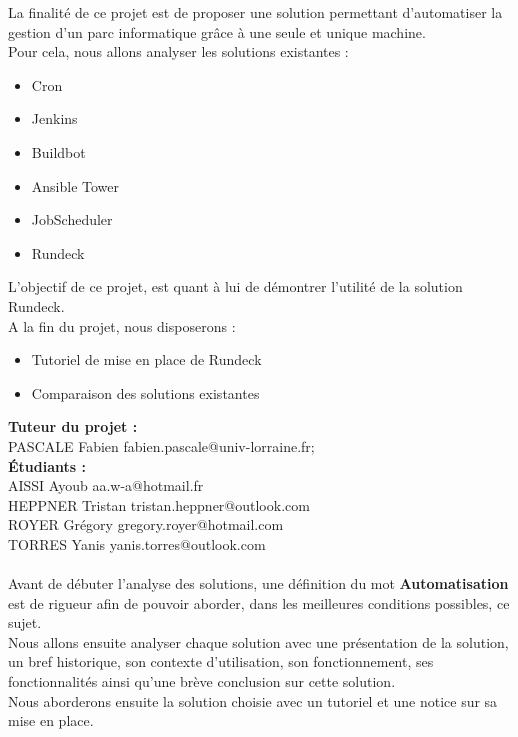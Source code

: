 \documentclass[12pt]{article}
\begin{document}
La finalité de ce projet est de proposer une solution permettant d'automatiser la gestion d'un parc informatique grâce à une seule et unique machine.
\vspace{0.5cm}
\\
Pour cela, nous allons analyser les solutions existantes :
\begin{itemize}
    \item Cron
    \item Jenkins
    \item Buildbot
    \item Ansible Tower
    \item JobScheduler
    \item Rundeck
\end{itemize}
\vspace{0.5cm}
L'objectif de ce projet, est quant à lui de démontrer l'utilité de la solution Rundeck.
\vspace{0.5cm}
\\
A la fin du projet, nous disposerons :
\begin{itemize}
    \item Tutoriel de mise en place de Rundeck
    \item Comparaison des solutions existantes
\end{itemize}
\vspace{0.5cm}
\textbf{Tuteur du projet : }
\\
PASCALE Fabien \hspace{3.3cm} fabien.pascale@univ-lorraine.fr; 
\vspace{0.5cm}
\\
\textbf{Étudiants : }
\\
AISSI Ayoub \hspace{4.2cm} aa.w-a@hotmail.fr
\\ 
HEPPNER Tristan \hspace{3.2cm} tristan.heppner@outlook.com
\\ 
ROYER Grégory \hspace{3.5cm} gregory.royer@hotmail.com
\\ 
TORRES Yanis \hspace{3.7cm} yanis.torres@outlook.com
\\
\vspace{0.5cm}
\\
Avant de débuter l'analyse des solutions, une définition du mot \textbf{Automatisation} est de rigueur afin de pouvoir aborder, dans les meilleures conditions possibles, ce sujet.
\\
Nous allons ensuite analyser chaque solution avec une présentation de la solution, un bref historique, son contexte d'utilisation, son fonctionnement, ses fonctionnalités ainsi qu'une brève conclusion sur cette solution.
\\
Nous aborderons ensuite la solution choisie avec un tutoriel et une notice sur sa mise en place.
\end{document}
